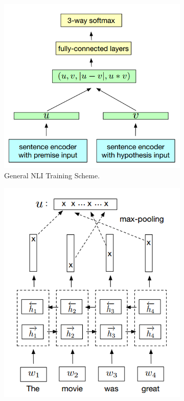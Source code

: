 \begin{figure}
	\captionsetup[subfigure]{justification=centering}
	\centering
	\begin{subfigure}[b]{.5\textwidth}
		\centering
		\includegraphics[width=\textwidth]{figures/semantic_textual_similarity/sentence_encoders/infersent_general.png}
		\caption{General NLI Training Scheme.}
		\label{fig:infersent_general}
	\end{subfigure}%
	\begin{subfigure}[b]{.5\textwidth}
		\centering
		\includegraphics[width=\textwidth]{figures/semantic_textual_similarity/sentence_encoders/infersent.png}

\end{subfigure}
\end{figure}
